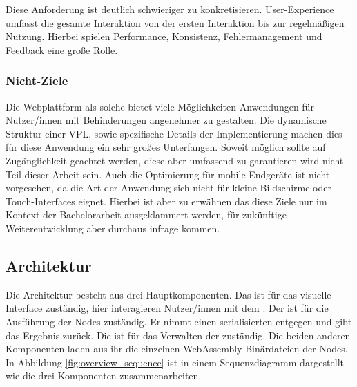 \documentclass[ngerman]{article}
\begin{document}
Diese Anforderung ist deutlich schwieriger zu konkretisieren. User-Experience umfasst die gesamte Interaktion von der ersten Interaktion bis zur regelmäßigen Nutzung.
Hierbei spielen Performance, Konsistenz, Fehlermanagement und Feedback eine große Rolle.
\br
{}

\subsubsection{Nicht-Ziele}

Die Webplattform als solche bietet viele Möglichkeiten Anwendungen für Nutzer/innen mit Behinderungen angenehmer zu gestalten. 
Die dynamische Struktur einer VPL, sowie spezifische Details der Implementierung machen dies für diese Anwendung ein sehr großes Unterfangen. 
Soweit möglich sollte auf Zugänglichkeit geachtet werden, diese aber umfassend zu garantieren wird nicht Teil dieser Arbeit sein.
\br
Auch die Optimierung für mobile Endgeräte ist nicht vorgesehen, da die Art der Anwendung sich nicht für kleine Bildschirme oder Touch-Interfaces eignet.
\br
Hierbei ist aber zu erwähnen das diese Ziele nur im Kontext der Bachelorarbeit ausgeklammert werden, für zukünftige Weiterentwicklung aber durchaus infrage kommen.

\pagebreak

\subsection{Architektur}
\label{sec:Architektur}

Die Architektur besteht aus drei Hauptkomponenten. 
Das  ist für das visuelle Interface zuständig, hier interagieren Nutzer/innen mit dem .
\br
Der  ist für die Ausführung der Nodes zuständig. Er nimmt einen serialisierten  entgegen und gibt das Ergebnis zurück.
\br
Die  ist für das Verwalten der  zuständig. Die beiden anderen Komponenten laden aus ihr die einzelnen WebAssembly-Binärdateien der Nodes.
\br
In Abbildung \ref{fig:overview_sequence} ist in einem Sequenzdiagramm dargestellt wie die drei Komponenten zusammenarbeiten.
\end{document}
